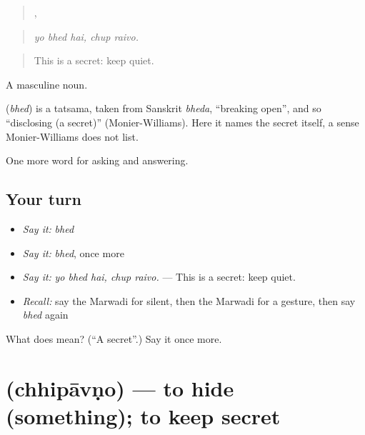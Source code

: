 \begin{quote}
  ,  
\end{quote}

\begin{quote}
\emph{yo bhed hai, chup raivo.}
\end{quote}

\begin{quote}
This is a secret: keep quiet.
\end{quote}

A masculine noun.

\begin{cousinweb}
\textbf{} (\emph{bhed}) is a tatsama, taken from Sanskrit \emph{bheda}, \textquotedblleft{}breaking open\textquotedblright{}, and so \textquotedblleft{}disclosing (a secret)\textquotedblright{} (Monier-Williams). Here it names the secret itself, a sense Monier-Williams does not list.
\end{cousinweb}

\begin{grammarlens}[title={What you've built}]
One more word for asking and answering.
\end{grammarlens}

\subsection*{Your turn}
\begin{itemize}
\raggedright
  \item \emph{Say it:} \emph{bhed}
  \item \emph{Say it:} \emph{bhed}, once more
  \item \emph{Say it:} \emph{yo bhed hai, chup raivo.} — This is a secret: keep quiet.
  \item \emph{Recall:} say the Marwadi for silent, then the Marwadi for a gesture, then say \emph{bhed} again
\end{itemize}

\begin{tcolorbox}[breakable,colback=teal!4,colframe=teal!35!black,title={Before you move on}]
What does  mean? (\textquotedblleft{}A secret\textquotedblright{}.) Say it once more.
\end{tcolorbox}
\section[\texorpdfstring{\mw{छिपावणो} (chhipāvṇo)}{छिपावणो (chhipāvṇo)}]{ (chhipāvṇo) — to hide (something); to keep secret}

